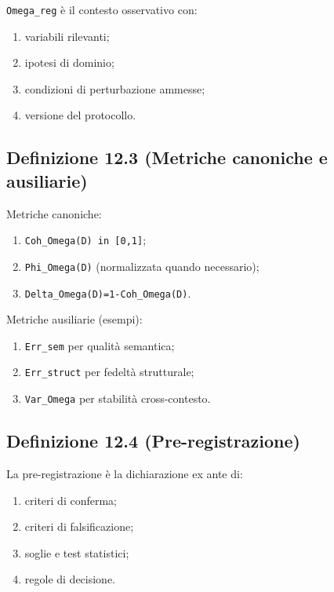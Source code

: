 \texttt{Omega\_reg} è il contesto osservativo con:

\begin{enumerate}
\def\labelenumi{\arabic{enumi}.}
\tightlist
\item
  variabili rilevanti;
\item
  ipotesi di dominio;
\item
  condizioni di perturbazione ammesse;
\item
  versione del protocollo.
\end{enumerate}

\subsection{Definizione 12.3 (Metriche canoniche e ausiliarie)}

Metriche canoniche:

\begin{enumerate}
\def\labelenumi{\arabic{enumi}.}
\tightlist
\item
  \texttt{Coh\_Omega(D)\ in\ {[}0,1{]}};
\item
  \texttt{Phi\_Omega(D)} (normalizzata quando necessario);
\item
  \texttt{Delta\_Omega(D)=1-Coh\_Omega(D)}.
\end{enumerate}

Metriche ausiliarie (esempi):

\begin{enumerate}
\def\labelenumi{\arabic{enumi}.}
\tightlist
\item
  \texttt{Err\_sem} per qualità semantica;
\item
  \texttt{Err\_struct} per fedeltà strutturale;
\item
  \texttt{Var\_Omega} per stabilità cross-contesto.
\end{enumerate}

\subsection{Definizione 12.4 (Pre-registrazione)}

La pre-registrazione è la dichiarazione ex ante di:

\begin{enumerate}
\def\labelenumi{\arabic{enumi}.}
\tightlist
\item
  criteri di conferma;
\item
  criteri di falsificazione;
\item
  soglie e test statistici;
\item
  regole di decisione.
\end{enumerate}

